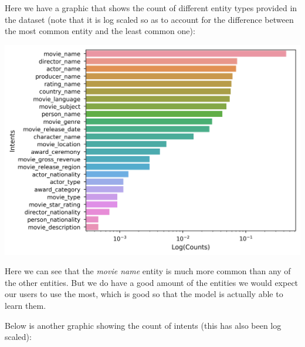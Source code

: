 \documentclass[11pt,a4paper]{article}
\begin{document}
		Here we have a graphic that shows the count of different entity types provided in the dataset (note that it is log scaled so as to account for the difference between the most common entity and the least common one):
		
		\hspace*{-0.4cm}\includegraphics[scale=0.5]{entities_frequency}
		
		Here we can see that the \textit{movie name} entity is much more common than any of the other entities. But we do have a good amount of the entities we would expect our users to use the most, which is good so that the model is actually able to learn them.  
		
		Below is another graphic showing the count of intents (this has also been log scaled):
		
\end{document}
